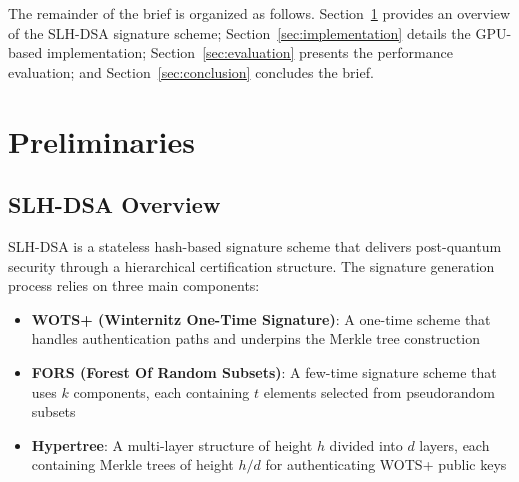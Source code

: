\documentclass[journal]{IEEEtran}
\begin{document}
The remainder of the brief is organized as follows. Section~\ref{sec:preliminaries} provides an overview of the SLH-DSA signature scheme; Section~\ref{sec:implementation} details the GPU-based implementation; Section~\ref{sec:evaluation} presents the performance evaluation; and Section~\ref{sec:conclusion} concludes the brief.

\section{Preliminaries}\label{sec:preliminaries}

\subsection{SLH-DSA Overview}

SLH-DSA is a stateless hash-based signature scheme that delivers post-quantum security through a hierarchical certification structure. The signature generation process relies on three main components:

\begin{itemize}
  \item \textbf{WOTS+ (Winternitz One-Time Signature)}: A one-time scheme that handles authentication paths and underpins the Merkle tree construction
  \item \textbf{FORS (Forest Of Random Subsets)}: A few-time signature scheme that uses $k$ components, each containing $t$ elements selected from pseudorandom subsets
  \item \textbf{Hypertree}: A multi-layer structure of height $h$ divided into $d$ layers, each containing Merkle trees of height $h/d$ for authenticating WOTS+ public keys
\end{itemize}
\end{document}
